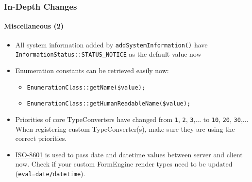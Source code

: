 \begin{frame}[fragile]
	\frametitle{In-Depth Changes}
	\framesubtitle{Miscellaneous (2)}


	\begin{itemize}
		\item All system information added by \texttt{addSystemInformation()} have
			\texttt{InformationStatus::STATUS\_NOTICE} as the default value now
		\item Enumeration constants can be retrieved easily now:

			\begin{itemize}
				\item \texttt{EnumerationClass::getName(\$value);}
				\item \texttt{EnumerationClass::getHumanReadableName(\$value);}
			\end{itemize}

		\item Priorities of core TypeConverters have changed from\newline
			\texttt{1}, \texttt{2}, \texttt{3},... to \texttt{10}, \texttt{20}, \texttt{30},...
			When registering custom TypeConverter(s), make sure they are using the correct priorities.

		\item \href{https://en.wikipedia.org/wiki/ISO_8601}{ISO-8601} is used to pass date and datetime
			values between server and client now. Check if your custom FormEngine render types need to
			be updated (\texttt{eval=date/datetime}).

	\end{itemize}

\end{frame}

